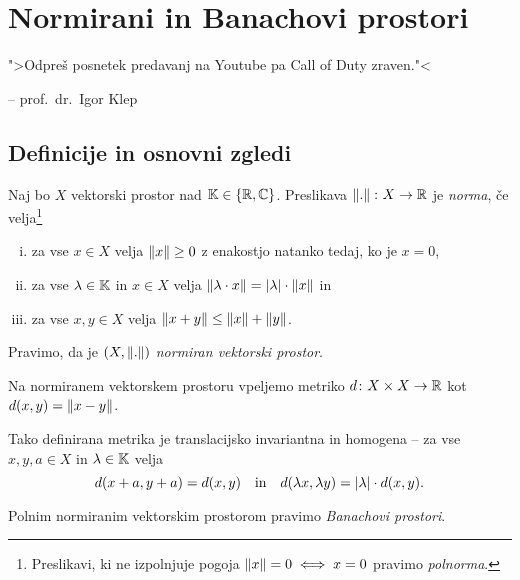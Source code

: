 \section{Normirani in Banachovi prostori}

\epigraph{">Odpreš posnetek predavanj na Youtube pa Call of Duty
zraven."<}{-- prof.~dr.~Igor Klep}

\subsection{Definicije in osnovni zgledi}


\begin{definicija}
Naj bo $X$ vektorski prostor nad $\mathbb{K} \in \left\{\mathbb{R}, \mathbb{C}\right\}$. Preslikava
$\left\lVert .\right\rVert \colon X \to \mathbb{R}$ je \emph{norma}, če
velja\footnote{Preslikavi, ki ne izpolnjuje pogoja
$\left\lVert x\right\rVert = 0 \iff x = 0$ pravimo \emph{polnorma}.}

\begin{enumerate}[i)]
\item za vse $x \in X$ velja $\left\lVert x\right\rVert \geq 0$ z enakostjo natanko
tedaj, ko je $x=0$,
\item za vse $\lambda \in \mathbb{K}$ in $x \in X$ velja
$\left\lVert \lambda \cdot x\right\rVert = \left\lvert \lambda\right\rvert \cdot \left\lVert x\right\rVert$ in
\item za vse $x,y \in X$ velja $\left\lVert x+y\right\rVert \leq \left\lVert x\right\rVert + \left\lVert y\right\rVert$.
\end{enumerate}

Pravimo, da je $(X, \left\lVert .\right\rVert)$
\emph{normiran vektorski prostor}.
\end{definicija}

\begin{definicija}
Na normiranem vektorskem prostoru vpeljemo metriko
$d \colon X \times X \to \mathbb{R}$ kot $d(x,y) = \left\lVert x-y\right\rVert$.
\end{definicija}

\begin{opomba}
Tako definirana metrika je translacijsko invariantna in homogena --
za vse $x,y,a \in X$ in $\lambda \in \mathbb{K}$ velja
\[
d(x+a, y+a) = d(x, y)
\quad \text{in} \quad
d(\lambda x, \lambda y) = \left\lvert \lambda\right\rvert \cdot d(x,y).
\]
\end{opomba}

\begin{definicija}
Polnim normiranim vektorskim prostorom pravimo
\emph{Banachovi prostori}.
\end{definicija}


